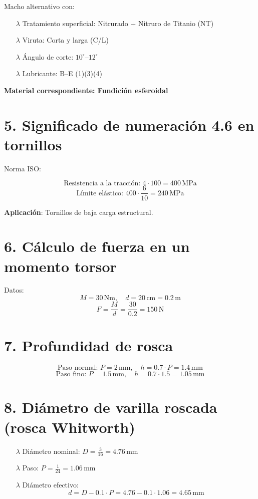 \documentclass[a4paper,12pt]{article}
\begin{document}
Macho alternativo con:

\begin{itemize}
\item[$\lambda$] Tratamiento superficial: Nitrurado + Nitruro de Titanio (NT)
\item[$\lambda$] Viruta: Corta y larga (C/L)
\item[$\lambda$] Ángulo de corte: $10^\circ$–$12^\circ$
\item[$\lambda$] Lubricante: B–E (1)(3)(4)
\end{itemize}

\textbf{Material correspondiente: Fundición esferoidal}

\section*{5. Significado de numeración 4.6 en tornillos}

Norma ISO:

\[
\text{Resistencia a la tracción: } 4 \cdot 100 = 400\,\text{MPa}
\]
\[
\text{Límite elástico: } 400 \cdot \frac{6}{10} = 240\,\text{MPa}
\]

\textbf{Aplicación}: Tornillos de baja carga estructural.

\section*{6. Cálculo de fuerza en un momento torsor}

Datos:
\[
M = 30\,\text{Nm},\quad d = 20\,\text{cm} = 0.2\,\text{m}
\]
\[
F = \frac{M}{d} = \frac{30}{0.2} = 150\,\text{N}
\]

\section*{7. Profundidad de rosca}

\[
\text{Paso normal: } P = 2\,\text{mm},\quad h = 0.7 \cdot P = 1.4\,\text{mm}
\]
\[
\text{Paso fino: } P = 1.5\,\text{mm},\quad h = 0.7 \cdot 1.5 = 1.05\,\text{mm}
\]

\section*{8. Diámetro de varilla roscada (rosca Whitworth)}

\begin{itemize}
\item[$\lambda$] Diámetro nominal: $D = \frac{3}{16} = 4.76\,\text{mm}$
\item[$\lambda$] Paso: $P = \frac{1}{24} = 1.06\,\text{mm}$
\item[$\lambda$] Diámetro efectivo:
\[
d = D - 0.1 \cdot P = 4.76 - 0.1 \cdot 1.06 = 4.65\,\text{mm}
\]
\end{itemize}
\end{document}
